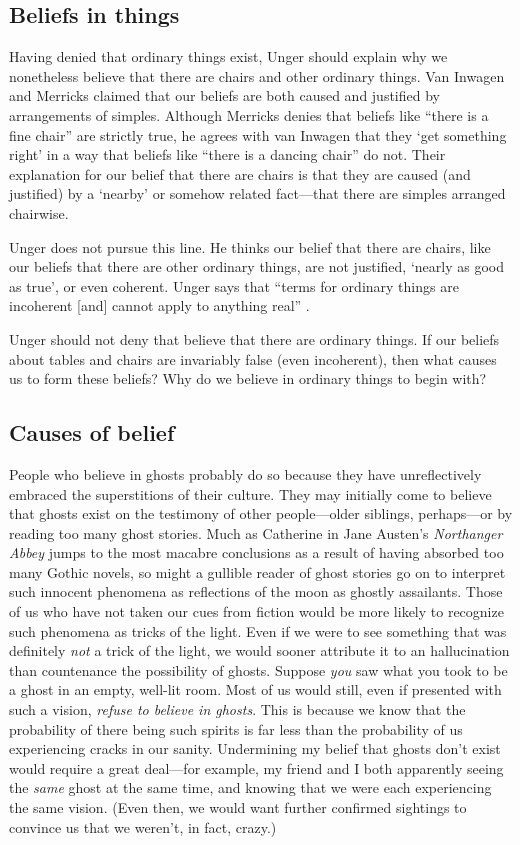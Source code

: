 \documentclass[11pt]{article}
\begin{document}
\begin{spacing}{1.5}
\subsection{Beliefs in things}
\label{beliefs}
Having denied that ordinary things exist, Unger should explain why we
nonetheless believe that there are chairs and other ordinary things.
Van Inwagen and Merricks claimed that our beliefs are both caused and
justified by arrangements of simples.  Although Merricks denies that
beliefs like ``there is a fine chair'' are strictly true, he agrees with
van Inwagen that they `get something right' in a way that beliefs like
``there is a dancing chair'' do not.  Their explanation for our
belief that there are chairs is that they are caused (and justified)
by a `nearby' or somehow related fact---that there are simples
arranged chairwise.  

Unger does not pursue this line.  He thinks our belief that there are
chairs, like our beliefs that there are other ordinary things, are not
justified, `nearly as good as true', or even coherent.  Unger says
that ``terms for ordinary things are incoherent [and] cannot apply to
anything real'' \citep[147]{unger1979}.

Unger should not deny that believe that there are ordinary things.  If
our beliefs about tables and chairs are invariably false (even
incoherent), then what causes us to form these beliefs?  Why do we
believe in ordinary things to begin with?

\subsection{Causes of belief}
\label{unger-cause}
People who believe in ghosts probably do so because they have
unreflectively embraced the superstitions of their culture.  They may
initially come to believe that ghosts exist on the testimony of other
people---older siblings, perhaps---or by reading too many ghost
stories.  Much as Catherine in Jane Austen's {\em Northanger Abbey}
jumps to the most macabre conclusions as a result of having absorbed
too many Gothic novels, so might a gullible reader of ghost stories go
on to interpret such innocent phenomena as reflections of the moon as
ghostly assailants.  Those of us who have not taken our cues from
fiction would be more likely to recognize such phenomena as tricks of
the light.  Even if we were to see something that was definitely {\em
  not} a trick of the light, we would sooner attribute it to an
hallucination than countenance the possibility of ghosts.  Suppose
{\em you} saw what you took to be a ghost in an empty, well-lit room.
Most of us would still, even if presented with such a vision, {\em
  refuse to believe in ghosts}.  This is because we know that the
probability of there being such spirits is far less than the
probability of us experiencing cracks in our sanity.  Undermining my
belief that ghosts don't exist would require a great deal---for
example, my friend and I both apparently seeing the {\em same} ghost
at the same time, and knowing that we were each experiencing the same
vision.  (Even then, we would want further confirmed sightings to
convince us that we weren't, in fact, crazy.)


\end{spacing}
\end{document}
